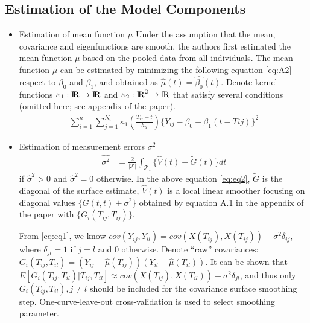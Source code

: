 \documentclass[11pt]{report}
\begin{document}
\subsection*{Estimation of the Model Components}
\begin{itemize}
	\item{Estimation of mean function $\mu$}
	Under the assumption that the mean, covariance and eigenfunctions are smooth, the authors first estimated the mean function $\mu$ based on the pooled data from all individuals.
	The mean function $\mu$ can be estimated by minimizing the following equation \eqref{eq:A2} respect to $\beta_0$ and $\beta_1$, and obtained as $\hat{\mu}(t) = \hat{\beta_0}(t)$.
	Denote kernel functions $\kappa_1: {\rm I\!R} \rightarrow {\rm I\!R} $ and $\kappa_2: {\rm I\!R}^2 \rightarrow {\rm I\!R} $ that satisfy several conditions (omitted here; see appendix of the paper).
	\begin{align}
		\label{eq:A2}
		\sum_{i=1}^{n}\sum_{j=1}^{N_i}\kappa_1(\frac{T_{ij}-t}{h_\mu})\{Y_{ij}-\beta_0-\beta_1(t-T{ij})\}^2{}
	\end{align}



	\item{Estimation of measurement errors $\sigma^2$}
	\begin{align}
	    \label{eq:eq2}
	    \hat{\sigma^2} &= \frac{2}{|\mathcal{T}|}\int_{\mathcal{T}_1}\{\hat{V}(t) - \tilde{G}(t)\}dt 
	\end{align}
	if $\hat{\sigma}^2>0$ and $\hat{\sigma}^2 = 0$ otherwise.
	In the above equation \eqref{eq:eq2}, $\tilde{G}$ is the diagonal of the surface estimate, $\hat{V}(t)$ is a local linear smoother focusing on diagonal values $\{G(t,t) + \sigma^2\}$ obtained by equation A.1 in the appendix of the paper with $\{G_i(T_{ij}, T_{ij})\}$.


	From \eqref{eq:eq1}, we know $cov(Y_{ij}, Y_{il}) = cov(X(T_{ij}), X(T_{ij}))+\sigma^2\delta_{ij}$, where $\delta_{jl} = 1$ if $j=l$ and $0$ otherwise. 
	Denote ``raw'' covariances: $G_i(T_{ij}, T_{il}) = (Y_{ij}-\hat{\mu}(T_{ij}))(Y_{il}-\hat{\mu}(T_{il}))$.
	It can be shown that $E{\left[G_i(T_{ij}, T_{il})|T_{ij}, T_{il}\right]} \approx cov(X(T_{ij}), X(T_{il})) + \sigma^2 \delta_{jl}$, and thus only $G_i(T_{ij}, T_{il}), j\neq l$ should be included for the covariance surface smoothing step. 
	One-curve-leave-out cross-validation is used to select smoothing parameter. 


\end{itemize}
\end{document}
